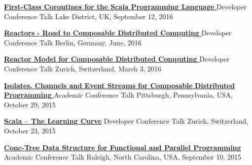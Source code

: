 \documentclass[9pt]{article}
\begin{document}
\noindent\href{https://www.youtube.com/watch?v=B3hKOUtc4e0}
{\bf First-Class Coroutines for the Scala Programming Language }
\vspace{-0.03in}
\newline\noindent Developer Conference Talk
\dates{}
\linebreak\noindent Lake District, UK, September 12, 2016
\bigskip

\noindent\href{https://www.youtube.com/watch?v=7lulYWWD4Qo}
{\bf Reactors - Road to Composable Distributed Computing }
\vspace{-0.03in}
\newline\noindent Developer Conference Talk
\dates{}
\linebreak\noindent Berlin, Germany, June, 2016
\bigskip

\noindent\href{https://cfp-vdz.exteso.com/program/speaker/aleksandar_prokopec.html}
{\bf Reactor Model for Composable Distributed Computing }
\vspace{-0.03in}
\newline\noindent Developer Conference Talk
\dates{}
\linebreak\noindent Zurich, Switzerland, March 3, 2016
\bigskip

\noindent\href{http://axel22.github.io/resources/docs/onward15.pdf}
{\bf Isolates, Channels and Event Streams for Composable }
\vspace{-0.03in}
\newline
\noindent\href{http://axel22.github.io/resources/docs/onward15.pdf}
{\bf Distributed Programming }
\newline\noindent Academic Conference Talk
\dates{}
\linebreak\noindent Pittsburgh, Pennsylvania, USA, October 29, 2015
\bigskip

\noindent\href{http://axel22.github.io/resources/docs/jazoon15.pdf}
{\bf Scala -- The Learning Curve}
\vspace{-0.03in}
\newline\noindent Developer Conference Talk
\dates{}
\linebreak\noindent Zurich, Switzerland, October 23, 2015
\bigskip

\noindent\href{http://axel22.github.io/slides/conc.html#/}
{\bf Conc-Tree Data Structure for Functional and Parallel Programming}
\vspace{-0.03in}
\newline\noindent Academic Conference Talk
\dates{}
\linebreak\noindent Raleigh, North Carolina, USA, September 10, 2015
\bigskip
\end{document}

